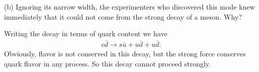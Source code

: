 (b) Ignoring its narrow width, the experimenters who discovered this mode knew immediately that it could not come from the strong decay of a meson.
Why?

Writing the decay in terms of quark content we have
\begin{eqnarray}
    \label{eq:decay-quark}
    c \overline{d} \rightarrow s \overline{u} + u \overline{d} + u \overline{d}
.\end{eqnarray}
Obviously, flavor is not conserved in this decay, but the strong force conserves quark flavor in any process.
So this decay cannot proceed strongly.





